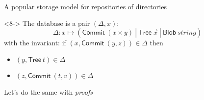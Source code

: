\documentclass[ignorenonframetext,red]{beamer}
\newcommand\gor{\ |\ }
\begin{document}
\begin{frame}{A popular storage model for repositories of directories}
\begin{onlyenv}
\begin{center}
    \end{center}
  \end{onlyenv}
  \begin{onlyenv}<8->
    The database is a pair $(\Delta, x)$:
    \[ \Delta : x \mapsto (\mathsf{Commit}\ (x\times y) \gor \mathsf{Tree}\ \vec x
    \gor \mathsf{Blob}\ string)\]
    with the invariant:
    if $(x, \mathsf{Commit}\ (y,z)) \in\Delta$ then
    \begin{itemize}
    \item $(y, \mathsf{Tree}\ t)\in\Delta$
    \item $(z, \mathsf{Commit}\ (t,v))\in\Delta$
    \end{itemize}
    \pause
    \begin{center}
      \vspace{4em} {\Large Let's do the same with \emph{proofs}}
     \end{center}
  \end{onlyenv}
\end{frame}
\end{document}
